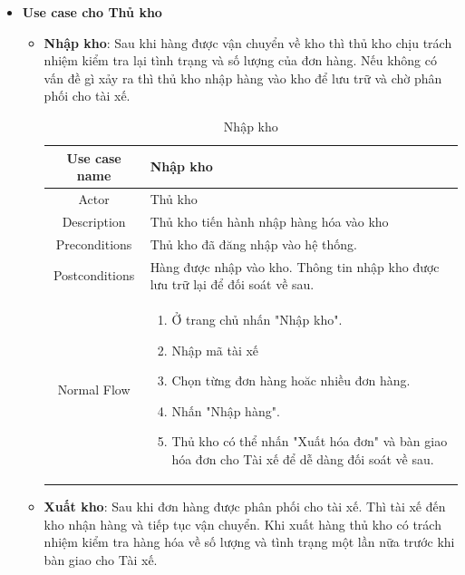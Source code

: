 \begin{itemize}
\begin{itemize}
	\end{itemize}


	\item \textbf{Use case cho Thủ kho}
	
	\begin{itemize}
		\item \textbf{Nhập kho}: Sau khi hàng được vận chuyển về kho thì thủ kho chịu trách nhiệm kiểm tra lại tình trạng và số lượng của đơn hàng. Nếu không có vấn đề gì xảy ra thì thủ kho nhập hàng vào kho để lưu trữ và chờ phân phối cho tài xế.
		
		\begin{table}[H]
			\centering\begin{tabular}{|c|m{25em}|}
				\hline 
				Use case name & Nhập kho\\ 
				\hline 
				Actor & Thủ kho \\ 
				\hline
				Description & Thủ kho tiến hành nhập hàng hóa vào kho \\
				\hline 
				Preconditions & Thủ kho đã đăng nhập vào hệ thống. \\
				\hline
				Postconditions & Hàng được nhập vào kho. Thông tin nhập kho được lưu trữ lại để đối soát về sau. \\
				\hline
				Normal Flow & \begin{enumerate}
					\item Ở trang chủ nhấn "Nhập kho".
					\item Nhập mã tài xế
					\item Chọn từng đơn hàng hoăc nhiều đơn hàng.
					\item Nhấn "Nhập hàng".
					\item Thủ kho có thể nhấn "Xuất hóa đơn" và bàn giao hóa đơn cho Tài xế để dễ dàng đối soát về sau.
				\end{enumerate}
				\\
				\hline
			\end{tabular}
			\caption{Nhập kho}
		\end{table}
	
		\item \textbf{Xuất kho}: Sau khi đơn hàng được phân phối cho tài xế. Thì tài xế đến kho nhận hàng và tiếp tục vận chuyển. Khi xuất hàng thủ kho có trách nhiệm kiểm tra hàng hóa về số lượng và tình trạng một lần nữa trước khi bàn giao cho Tài xế.
		

\end{itemize}
\end{itemize}
